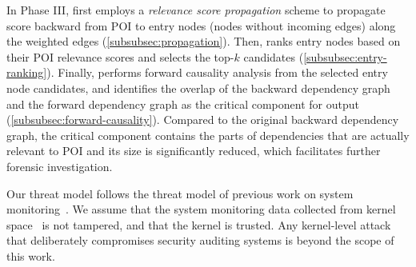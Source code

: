 %
In Phase III, \tool first employs a \emph{relevance score propagation} scheme to propagate score backward from POI to entry nodes (\ie nodes without incoming edges) along the weighted edges (\cref{subsubsec:propagation}).
Then, \tool ranks entry nodes based on their POI relevance scores and selects the top-$k$ candidates (\cref{subsubsec:entry-ranking}).
Finally, \tool performs forward causality analysis from the selected entry node candidates, and identifies the overlap of the backward dependency graph and the forward dependency graph as the critical component for output (\cref{subsubsec:forward-causality}). 
Compared to the original backward dependency graph, the critical component contains the parts of dependencies that are actually relevant to POI and its size is significantly reduced, which facilitates further forensic investigation.






Our threat model follows the threat model of previous work on system monitoring~\cite{backtracking,backtracking2,loggc,trustkernel,gao2018aiql,gao2018saql,liu2018priotracker,hassan2019nodoze}. 
We assume that the system monitoring data collected from kernel space~\cite{auditd,etw,dtrace,sysdig} is not tampered, and that the kernel is trusted.
Any kernel-level attack that deliberately compromises security auditing systems is beyond the scope of this work.




